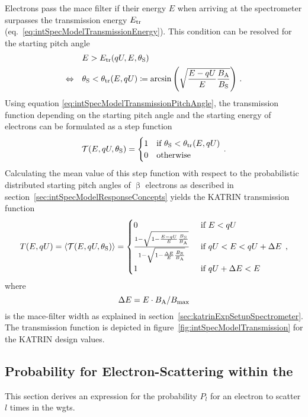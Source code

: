 Electrons pass the \gls{mace} filter if their energy $E$ when arriving at the spectrometer surpasses the transmission energy $E_\mathrm{tr}$ (eq.~\ref{eq:intSpecModelTransmissionEnergy}). This condition can be resolved for the starting pitch angle~\cite{Groh2015}
\begin{align}
&E > E_\mathrm{tr}(qU,E,\theta_\mathrm{S}) \nonumber \\
\Leftrightarrow \quad
& \theta_\mathrm{S} < \theta_\mathrm{tr}(E,qU)
\coloneqq
\arcsin
\left(\sqrt{
	\frac{E-qU}{E} 
	\frac{B_\mathrm{A}}{B_\mathrm{S}}
}\right)
\text{\,.}
\label{eq:intSpecModelTransmissionPitchAngle}
\end{align}
Using equation \eqref{eq:intSpecModelTransmissionPitchAngle}, the transmission function depending on the starting pitch angle and the starting energy of electrons can be formulated as a step function
\begin{equation}
\label{eq:intSpecModelTransmissionStep}
\mathcal{T}(E, qU, \theta_\mathrm{S}) =
\begin{cases}
1 & \text{if } \theta_\mathrm{S} < \theta_\mathrm{tr}(E,qU) \\
0 & \text{otherwise} 
\end{cases}
\text{\,.}
\end{equation}
Calculating the mean value of this step function with respect to the probabilistic distributed starting pitch angles of $\upbeta$ electrons as described in section~\ref{sec:intSpecModelResponseConcepts} yields the KATRIN transmission function~\cite{Angrik:2005ep}
\begin{equation}
\label{eq:intSpecModelTransmission}
	T(E, qU) = 
	\left\langle{\mathcal{T}(E, qU, \theta_\mathrm{S})}\right\rangle =
	\begin{cases}
	0 & \text{ if } E < qU \\
	\frac{
		1-\sqrt{
			1-\frac{E-qU}{E} 
			\frac{B_\mathrm{S}}{B_\mathrm{A}}
		} 
	}{
		1-\sqrt{1-\frac{\Delta E}{E}\frac{B_\mathrm{S}}{B_\mathrm{A}}}
	}
	& \text{ if } qU < E < qU + \Delta E \\
	1 & \text{ if } qU + \Delta E < E
	\end{cases}
	\text{\,,}
\end{equation}
where 
\begin{equation}
	\label{eq:intSpecModelTransmissionMACEFilterWidth}
	\Delta E=E\cdot B_\mathrm{A}/B_\mathrm{max}
\end{equation}
is the \gls{mace}-filter width as explained in section~\ref{sec:katrinExpSetupSpectrometer}. The transmission function is depicted in figure~\ref{fig:intSpecModelTransmission} for the KATRIN design values.

\subsection{Probability for Electron-Scattering within the }
\label{sec:intSpecModelResponseScattering}
This section derives an expression for the probability $P_l$ for an electron to scatter $l$ times in the \gls{wgts}.


